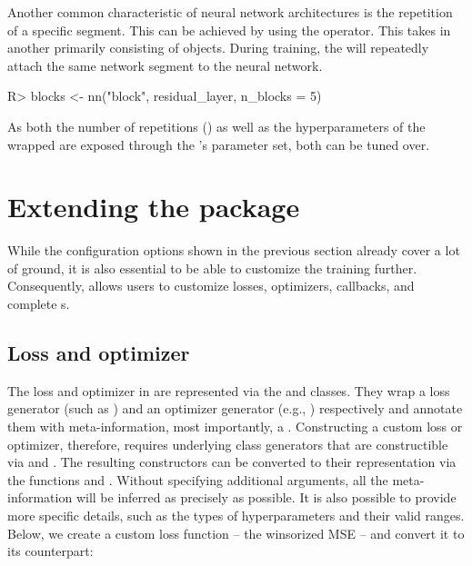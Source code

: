 \documentclass[article]{jss}
\theoremstyle{definition}
\begin{document}
Another common characteristic of neural network architectures is the repetition of a specific segment.
This can be achieved by using the  operator.
This  takes in another  primarily consisting of  objects.
During training, the  will repeatedly attach the same network segment to the neural network.

\begin{CodeInput}
R> blocks <- nn("block", residual_layer, n_blocks = 5)
\end{CodeInput}

As both the number of repetitions () as well as the hyperparameters of the wrapped  are exposed through the 's parameter set, both can be tuned over.


\section{Extending the package}\label{sec:extending}

While the configuration options shown in the previous section already cover a lot of ground, it is also essential to be able to customize the training further.
Consequently,  allows users to customize losses, optimizers, callbacks, and complete s.

\subsection{Loss and optimizer}\label{sec:extending-loss-opt}

The loss and optimizer in \mlrttorch{} are represented via the  and  classes.
They wrap a loss generator (such as ) and an optimizer generator (e.g., ) respectively and annotate them with meta-information, most importantly, a .
Constructing a custom loss or optimizer, therefore, requires underlying class generators that are constructible via  and .
The resulting constructors can be converted to their \mlrttorch{} representation via the functions  and .
Without specifying additional arguments, all the meta-information will be inferred as precisely as possible.
It is also possible to provide more specific details, such as the types of hyperparameters and their valid ranges.
Below, we create a custom  loss function -- the winsorized MSE -- and convert it to its \mlrttorch{} counterpart:
\end{document}

